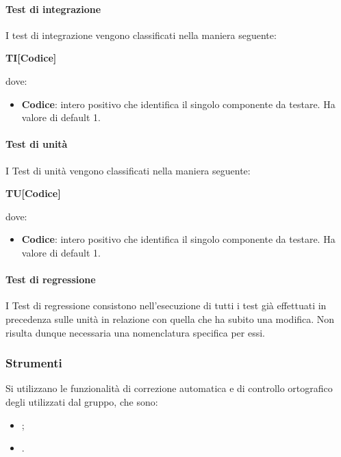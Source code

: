 		\paragraph{Test di integrazione}
		I test di integrazione vengono classificati nella maniera seguente:
		\begin{center}
			\textbf{TI[Codice]}
		\end{center}	
		dove:\\
		\begin{itemize}
			\item \textbf{Codice}: intero positivo che identifica il singolo componente da testare. Ha valore di default 1.
		\end{itemize}		 
		
		\paragraph{Test di unità}
		I Test di unità vengono classificati nella maniera seguente:
		\begin{center}
			\textbf{TU[Codice]}
		\end{center}		
		dove:\\
		\begin{itemize}
			\item \textbf{Codice}: intero positivo che identifica il singolo componente da testare. Ha valore di default 1.
		\end{itemize}
		
		\paragraph{Test di regressione}
		I Test di regressione consistono nell'esecuzione di tutti i test già effettuati in precedenza sulle unità in relazione con quella che ha subito una modifica. Non risulta dunque necessaria una nomenclatura specifica per essi.
		
		\subsubsection{Strumenti}
		Si utilizzano le funzionalità di correzione automatica e di controllo ortografico degli  utilizzati dal gruppo, che sono:
		\begin{itemize}
			\item {};
			\item {}.
		\end{itemize}
